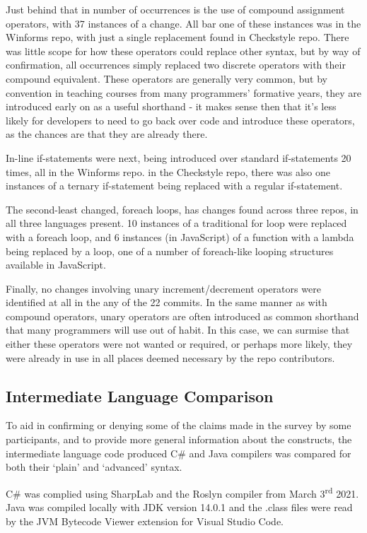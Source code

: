 \documentclass{article}
\begin{document}
        Just behind that in number of occurrences is the use of compound assignment operators, with 37 instances of a change. All bar one of these instances was in the Winforms repo, with just a single replacement found in Checkstyle repo. There was little scope for how these operators could replace other syntax, but by way of confirmation, all occurrences simply replaced two discrete operators with their compound equivalent. These operators are generally very common, but by convention in teaching courses from many programmers' formative years, they are introduced early on as a useful shorthand - it makes sense then that it's less likely for developers to need to go back over code and introduce these operators, as the chances are that they are already there.

        In-line if-statements were next, being introduced over standard if-statements 20 times, all in the Winforms repo. in the Checkstyle repo, there was also one instances of a ternary if-statement being replaced with a regular if-statement.

        The second-least changed, foreach loops, has changes found across three repos, in all three languages present. 10 instances of a traditional for loop were replaced with a foreach loop, and 6 instances (in JavaScript) of a  function with a lambda being replaced by a  loop, one of a number of foreach-like looping structures available in JavaScript.

        Finally, no changes involving unary increment/decrement operators were identified at all in the any of the 22 commits. In the same manner as with compound operators, unary operators are often introduced as common shorthand that many programmers will use out of habit. In this case, we can surmise that either these operators were not wanted or required, or perhaps more likely, they were already in use in all places deemed necessary by the repo contributors.

    \subsection{Intermediate Language Comparison}
    \label{subsec:ilComp}
        To aid in confirming or denying some of the claims made in the survey by some participants, and to provide more general information about the constructs, the intermediate language code produced C\# and Java compilers was compared for both their `plain' and `advanced' syntax.

        C\# was complied using SharpLab and the Roslyn compiler from March 3\textsuperscript{rd} 2021. Java was compiled locally with JDK version 14.0.1 and the .class files were read by the JVM Bytecode Viewer extension for Visual Studio Code.
\end{document}
